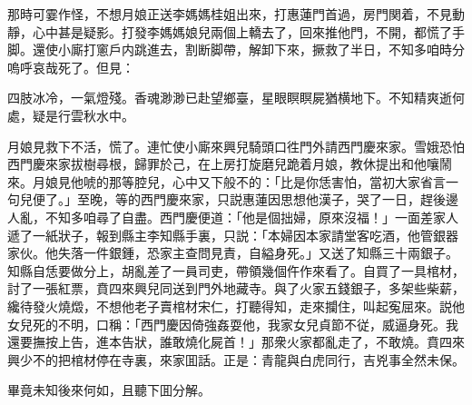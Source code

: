 那時可霎作怪，不想月娘正送李媽媽桂姐出來，打惠蓮門首過，房門関着，不見動靜，心中甚是疑影。打發李媽媽娘兒兩個上轎去了，回來推他門，不開，都慌了手脚。還使小廝打窻戶内跳進去，割断脚帶，解卸下來，撅救了半日，不知多咱時分嗚呼哀哉死了。但見：

\begin{myquote}
四肢冰冷，一氣燈殘。香魂渺渺已赴望鄉臺，星眼瞑瞑屍猶横地下。不知精爽逝何處，疑是行雲秋水中。
\end{myquote}

月娘見救下不活，慌了。連忙使小廝來興兒騎頭口徃門外請西門慶來家。雪娥恐怕西門慶來家拔樹尋根，歸罪於己，在上房打旋磨兒跪着月娘，教休提出和他嚷鬧來。月娘見他唬的那等腔兒，心中又下般不的：「比是你恁害怕，當初大家省言一句兒便了。」至晚，等的西門慶來家，只説惠蓮因思想他漢子，哭了一日，趕後邊人亂，不知多咱尋了自盡。西門慶便道：「他是個拙婦，原來沒福！」一面差家人遞了一紙狀子，報到縣主李知縣手裏，只説：「本婦因本家請堂客吃酒，他管銀器家伙。他失落一件銀鍾，恐家主查問見責，自縊身死。」又送了知縣三十兩銀子。知縣自恁要做分上，胡亂差了一員司吏，帶領幾個仵作來看了。自買了一具棺材，討了一張紅票，賁四來興兒同送到門外地藏寺。與了火家五錢銀子，多架些柴薪，纔待發火燒燬，不想他老子賣棺材宋仁，打聽得知，走來攔住，叫起寃屈來。説他女兒死的不明，口稱：「西門慶因倚強姦耍他，我家女兒貞節不従，威逼身死。我還要撫按上告，進本告狀，誰敢燒化屍首！」那衆火家都亂走了，不敢燒。賁四來興少不的把棺材停在寺裏，來家囬話。正是：青龍與白虎同行，吉兇事全然未保。

畢竟未知後來何如，且聽下囬分解。

